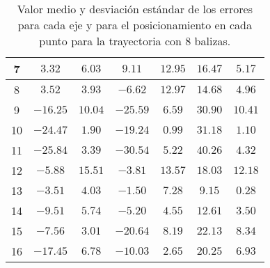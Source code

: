 \begin{table}[H]
\begin{tabular}{|c|c|c|c|c|c|c|}
                        7   &  $3.32$    &  $6.03$   &  $9.11$    &  $12.95$  &  $16.47$  &  $5.17$  \\ \hline
                        8   &  $3.52$    &  $3.93$   &  $-6.62$   &  $12.97$  &  $14.68$  &  $4.96$  \\ \hline
                        9   &  $-16.25$  &  $10.04$  &  $-25.59$  &  $6.59$   &  $30.90$  &  $10.41$ \\ \hline
                        10  &  $-24.47$  &  $1.90$   &  $-19.24$  &  $0.99$   &  $31.18$  &  $1.10$  \\ \hline
                        11  &  $-25.84$  &  $3.39$   &  $-30.54$  &  $5.22$   &  $40.26$  &  $4.32$  \\ \hline
                        12  &  $-5.88$   &  $15.51$  &  $-3.81$   &  $13.57$  &  $18.03$  &  $12.18$ \\ \hline
                        13  &  $-3.51$   &  $4.03$   &  $-1.50$   &  $7.28$   &  $9.15$   &  $0.28$  \\ \hline
                        14  &  $-9.51$   &  $5.74$   &  $-5.20$   &  $4.55$   &  $12.61$  &  $3.50$  \\ \hline
                        15  &  $-7.56$   &  $3.01$   &  $-20.64$  &  $8.19$   &  $22.13$  &  $8.34$  \\ \hline
                        16  &  $-17.45$  &  $6.78$   &  $-10.03$  &  $2.65$   &  $20.25$  &  $6.93$  \\ \hline
                    \end{tabular}
    \caption{Valor medio y desviación estándar de los errores para cada eje y para el posicionamiento en cada punto para la trayectoria con 8 balizas.}
    \label{tab:media_fisica_8_total}
\end{table}